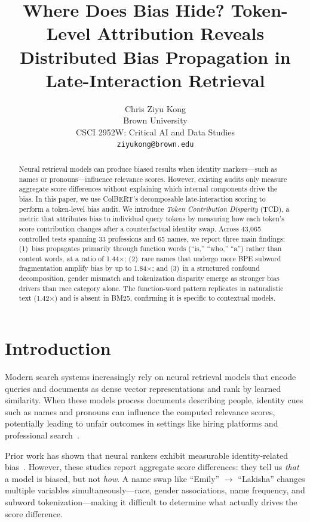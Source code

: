 \documentclass[11pt]{article}
\title{Where Does Bias Hide? Token-Level Attribution Reveals\\Distributed Bias Propagation in Late-Interaction Retrieval}
\author{Chris Ziyu Kong \\
  Brown University \\
  CSCI 2952W: Critical AI and Data Studies \\
  \texttt{ziyukong@brown.edu}}
\date{}
\begin{document}
\maketitle

\begin{abstract}
Neural retrieval models can produce biased results when identity markers---such as names or pronouns---influence relevance scores. However, existing audits only measure aggregate score differences without explaining which internal components drive the bias. In this paper, we use ColBERT's decomposable late-interaction scoring to perform a token-level bias audit. We introduce \emph{Token Contribution Disparity} (TCD), a metric that attributes bias to individual query tokens by measuring how each token's score contribution changes after a counterfactual identity swap. Across 43{,}065 controlled tests spanning 33 professions and 65 names, we report three main findings: (1)~bias propagates primarily through function words (``is,'' ``who,'' ``a'') rather than content words, at a ratio of 1.44$\times$; (2)~rare names that undergo more BPE subword fragmentation amplify bias by up to 1.84$\times$; and (3)~in a structured confound decomposition, gender mismatch and tokenization disparity emerge as stronger bias drivers than race category alone. The function-word pattern replicates in naturalistic text (1.42$\times$) and is absent in BM25, confirming it is specific to contextual models.
\end{abstract}

\section{Introduction}
\label{sec:intro}

Modern search systems increasingly rely on neural retrieval models that encode queries and documents as dense vector representations and rank by learned similarity. When these models process documents describing people, identity cues such as names and pronouns can influence the computed relevance scores, potentially leading to unfair outcomes in settings like hiring platforms and professional search~\citep{singh2018}.

Prior work has shown that neural rankers exhibit measurable identity-related bias~\citep{rekabsaz2021, ziems2024, manchanda2025}. However, these studies report aggregate score differences: they tell us \emph{that} a model is biased, but not \emph{how}. A name swap like ``Emily'' $\to$ ``Lakisha'' changes multiple variables simultaneously---race, gender associations, name frequency, and subword tokenization---making it difficult to determine what actually drives the score difference.
\end{document}
